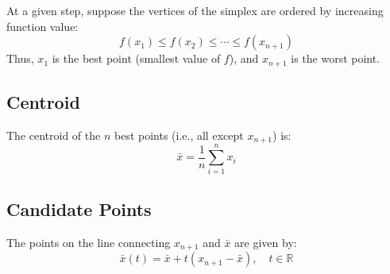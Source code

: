 At a given step, suppose the vertices of the simplex are ordered by increasing function value:
\begin{equation}
    f(x_1) \leq f(x_2) \leq \cdots \leq f(x_{n+1})
\end{equation}
Thus, $x_1$ is the best point (smallest value of $f$), and $x_{n+1}$ is the worst point.

\subsection{Centroid}

The centroid of the $n$ best points (i.e., all except $x_{n+1}$) is:
\begin{equation}
    \bar{x} = \frac{1}{n} \sum_{i=1}^{n} x_i
\end{equation}

\subsection{Candidate Points}

The points on the line connecting $x_{n+1}$ and $\bar{x}$ are given by:
\begin{equation}
    \bar{x}(t) = \bar{x} + t(x_{n+1} - \bar{x}), \quad t \in \mathbb{R}
\end{equation}

